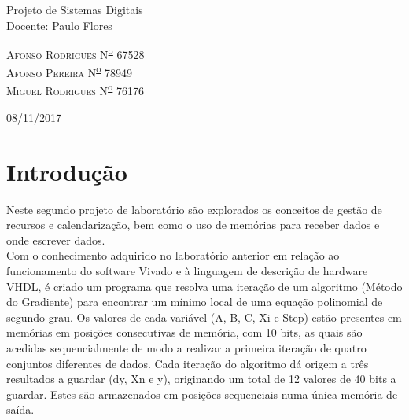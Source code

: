 \documentclass{article} %
\begin{document}
\begin{titlepage}
	Projeto de Sistemas Digitais \\ Docente: Paulo Flores

	\vspace*{3\baselineskip} %
	
	
	
	\vspace{0.5\baselineskip} %
	
	{\scshape\Large Afonso Rodrigues N\textsuperscript{\underline{o}} 67528 \\ Afonso Pereira N\textsuperscript{\underline{o}} 78949 \\ Miguel Rodrigues 
		N\textsuperscript{\underline{o}} 76176 \\} %
	
	\vspace{0.5\baselineskip} %
	
	\vfill %
	
	\vspace{0.3\baselineskip} %
	
	08/11/2017 %

\end{titlepage}

\shipout\null %


	
	\section{Introdução}
		Neste segundo projeto de laboratório são explorados os conceitos de gestão de recursos e calendarização, bem como o uso de memórias para receber dados e onde escrever dados.\\


		\noindent Com o conhecimento adquirido no laboratório anterior em relação ao funcionamento do software Vivado e à linguagem de descrição de hardware VHDL, é criado um programa que resolva uma iteração de um algoritmo (Método do Gradiente) para encontrar um mínimo local de uma equação polinomial de segundo grau. Os valores de cada variável (A, B, C, Xi e Step) estão presentes em memórias em posições consecutivas de memória, com 10 bits, as quais são acedidas sequencialmente de modo a realizar a primeira iteração de quatro conjuntos diferentes de dados. Cada iteração do algoritmo dá origem a três resultados a guardar (dy, Xn e y), originando um total de 12 valores de 40 bits a guardar. Estes são armazenados em posições sequenciais numa única memória de saída.\\	
\end{document}
